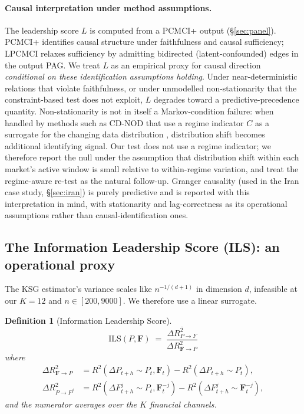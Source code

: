 \documentclass{article}
\newtheorem{definition}{Definition}
\begin{document}
\paragraph{Causal interpretation under method assumptions.}
The leadership score $L$ is computed from a PCMCI+ output (\S\ref{sec:panel}). PCMCI+ identifies causal structure under faithfulness and causal sufficiency; LPCMCI relaxes sufficiency by admitting bidirected (latent-confounded) edges in the output PAG. We treat $L$ as an empirical proxy for causal direction \emph{conditional on these identification assumptions holding}. Under near-deterministic relations that violate faithfulness, or under unmodelled non-stationarity that the constraint-based test does not exploit, $L$ degrades toward a predictive-precedence quantity. Non-stationarity is not in itself a Markov-condition failure: when handled by methods such as CD-NOD that use a regime indicator $C$ as a surrogate for the changing data distribution \citep{huang2020causal}, distribution shift becomes additional identifying signal. Our test does not use a regime indicator; we therefore report the null under the assumption that distribution shift within each market's active window is small relative to within-regime variation, and treat the regime-aware re-test as the natural follow-up. Granger causality (used in the Iran case study, \S\ref{sec:iran}) is purely predictive and is reported with this interpretation in mind, with stationarity and lag-correctness as its operational assumptions rather than causal-identification ones.

\subsection{The Information Leadership Score (ILS): an operational proxy}
\label{sec:ils}

The KSG estimator's variance scales like $n^{-1/(d+1)}$ in dimension $d$, infeasible at our $K = 12$ and $n \in [200, 9000]$. We therefore use a linear surrogate.

\begin{definition}[Information Leadership Score]
\label{def:ils}
\begin{equation}
\mathrm{ILS}(P, \mathbf{F}) \;=\; \frac{\overline{\Delta R^2_{P \to F}}}{\Delta R^2_{\mathbf{F} \to P}}
\label{eq:ils}
\end{equation}
where
\begin{align}
\Delta R^2_{\mathbf{F} \to P} &= R^2(\Delta P_{t+h} \sim P_t, \mathbf{F}_t) - R^2(\Delta P_{t+h} \sim P_t),\\
\Delta R^2_{P \to F^j} &= R^2(\Delta F^j_{t+h} \sim P_t, \mathbf{F}^{-j}_t) - R^2(\Delta F^j_{t+h} \sim \mathbf{F}^{-j}_t),
\end{align}
and the numerator averages over the $K$ financial channels.
\end{definition}
\end{document}
